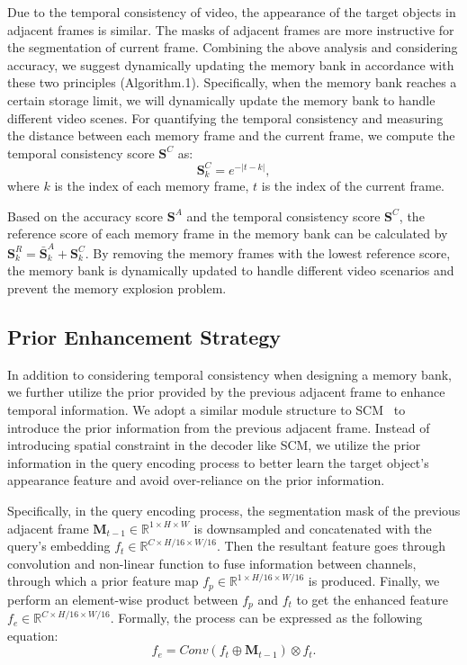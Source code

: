 \documentclass[runningheads]{llncs}
\begin{document}
    Due to the temporal consistency of video, the appearance of the target objects in adjacent frames is similar. 
The masks of adjacent frames are more instructive for the segmentation of current frame.
Combining the above analysis and considering accuracy, we suggest dynamically updating the memory bank in accordance with these two principles (Algorithm.1).
    Specifically, when the memory bank reaches a certain storage limit, we will dynamically update the memory bank to handle different video scenes.
    For quantifying the temporal consistency and measuring the distance between each memory frame and the current frame, we compute the temporal consistency score $\mathbf{S}^C$ as:
    \begin{equation}
    \label{consistency}
        \mathbf{S}_k^C = e^{-|t-k|},
    \end{equation}
    where $k$ is the index of each memory frame, $t$ is the index of the current frame.
    
    Based on the accuracy score $\mathbf{S}^A$ and the temporal consistency score $\mathbf{S}^C$, the reference score of each memory frame in the memory bank can be calculated by $\mathbf{S}^R_k = \mathbf{\bar{S}}^A_k + \mathbf{S}^C_k$.
By removing the memory frames with the lowest reference score, the memory bank is dynamically updated to handle different video scenarios and prevent the memory explosion problem.


    \subsection{Prior Enhancement Strategy} 
    
    In addition to considering temporal consistency when designing a memory bank, we further utilize the prior provided by the previous adjacent frame to enhance temporal information.
    We adopt a similar module structure to SCM~\cite{davis1st} to introduce the prior information from the previous adjacent frame.
    Instead of introducing spatial constraint in the decoder like SCM, we utilize the prior information in the query encoding process to better learn the target object's appearance feature and avoid over-reliance on the prior information.
    
    Specifically, in the query encoding process, the segmentation mask of the previous adjacent frame $\mathbf{M}_{t-1}\in\mathbb{R}^{1\times H\times W}$ is downsampled and concatenated with the query's embedding $f_t\in\mathbb{R}^{C\times H/16\times W/16}$.
    Then the resultant feature goes through convolution and non-linear function to fuse information between channels, through which a prior feature map $f_p\in\mathbb{R}^{1\times H/16\times W/16}$ is produced.
    Finally, we perform an element-wise product between $f_{p}$ and $f_t$ to get the enhanced feature $f_e\in\mathbb{R}^{C\times H/16\times W/16}$. Formally, the process can be expressed as the following equation:
    \begin{equation}
        f_{e} = \mathit{Conv}(f_t \oplus \mathbf{M}_{t-1}) \otimes f_t.
    \end{equation}
    
\end{document}
